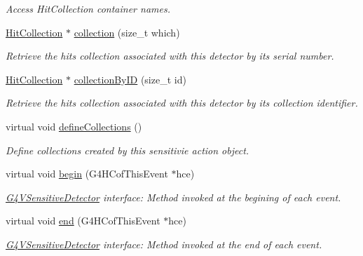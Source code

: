 \begin{DoxyCompactItemize}
\begin{DoxyCompactList}\small\item\em Access HitCollection container names. \item\end{DoxyCompactList}\item 
\hyperlink{class_d_d4hep_1_1_simulation_1_1_geant4_hit_collection}{HitCollection} $\ast$ \hyperlink{class_d_d4hep_1_1_simulation_1_1_geant4_sensitive_a49d2a794d7824475b7bac71d7342306b}{collection} (size\_\-t which)
\begin{DoxyCompactList}\small\item\em Retrieve the hits collection associated with this detector by its serial number. \item\end{DoxyCompactList}\item 
\hyperlink{class_d_d4hep_1_1_simulation_1_1_geant4_hit_collection}{HitCollection} $\ast$ \hyperlink{class_d_d4hep_1_1_simulation_1_1_geant4_sensitive_ad45d2c806dd89d1434ba8eec35b87843}{collectionByID} (size\_\-t id)
\begin{DoxyCompactList}\small\item\em Retrieve the hits collection associated with this detector by its collection identifier. \item\end{DoxyCompactList}\item 
virtual void \hyperlink{class_d_d4hep_1_1_simulation_1_1_geant4_sensitive_a88c872b79e49e399c8ee282960c2d77d}{defineCollections} ()
\begin{DoxyCompactList}\small\item\em Define collections created by this sensitivie action object. \item\end{DoxyCompactList}\item 
virtual void \hyperlink{class_d_d4hep_1_1_simulation_1_1_geant4_sensitive_a2967b095e6c32ae82f68a8b25a086c86}{begin} (G4HCofThisEvent $\ast$hce)
\begin{DoxyCompactList}\small\item\em \hyperlink{class_g4_v_sensitive_detector}{G4VSensitiveDetector} interface: Method invoked at the begining of each event. \item\end{DoxyCompactList}\item 
virtual void \hyperlink{class_d_d4hep_1_1_simulation_1_1_geant4_sensitive_abcce05101539a9941c06aada4625a608}{end} (G4HCofThisEvent $\ast$hce)
\begin{DoxyCompactList}\small\item\em \hyperlink{class_g4_v_sensitive_detector}{G4VSensitiveDetector} interface: Method invoked at the end of each event. \item\end{DoxyCompactList}\item 

\end{DoxyCompactItemize}
